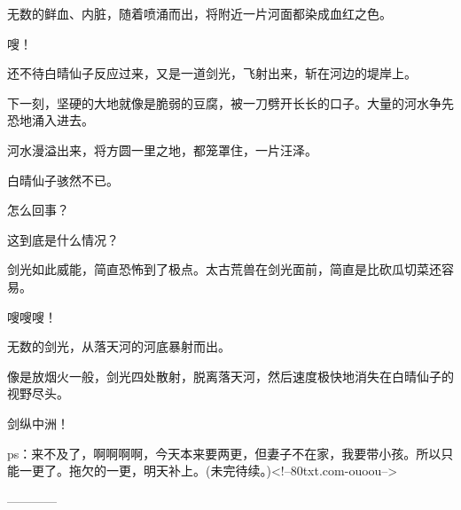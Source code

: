\begin{this_body}
无数的鲜血、内脏，随着喷涌而出，将附近一片河面都染成血红之色。

嗖！

还不待白晴仙子反应过来，又是一道剑光，飞射出来，斩在河边的堤岸上。

下一刻，坚硬的大地就像是脆弱的豆腐，被一刀劈开长长的口子。大量的河水争先恐地涌入进去。

河水漫溢出来，将方圆一里之地，都笼罩住，一片汪泽。

白晴仙子骇然不已。

怎么回事？

这到底是什么情况？

剑光如此威能，简直恐怖到了极点。太古荒兽在剑光面前，简直是比砍瓜切菜还容易。

嗖嗖嗖！

无数的剑光，从落天河的河底暴射而出。

像是放烟火一般，剑光四处散射，脱离落天河，然后速度极快地消失在白晴仙子的视野尽头。

剑纵中洲！

ps：来不及了，啊啊啊啊，今天本来要两更，但妻子不在家，我要带小孩。所以只能一更了。拖欠的一更，明天补上。(未完待续。)<!--80txt.com-ouoou-->

------------

\end{this_body}

